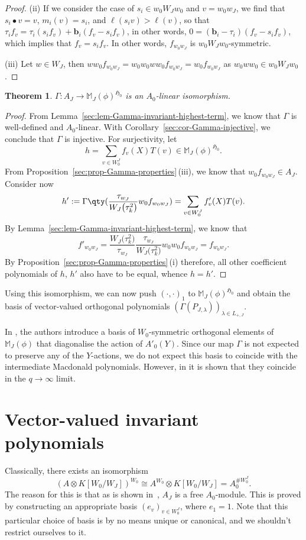 \documentclass[10pt,a4paper]{amsart}
\newtheorem{Theorem}{Theorem}[section]
\theoremstyle{definition}
\numberwithin{equation}{section}
\begin{document}
\begin{proof}
(ii) If we consider the case of $s_i\in w_0W_Jw_0$ and $v=w_0w_J$, we find
 that $s_i\bullet v=v$, $m_i(v)=s_i$, and $\ell(s_iv)>\ell(v)$, so that
$
 \tau_i f_v = \tau_i (s_if_v) + \bm{b}_i(f_v-s_if_v)$,
 in other words,
$
 0 = (\bm{b}_i-\tau_i)(f_v-s_if_v)$,
 which implies that $f_v=s_if_v$. In other words, $f_{w_0w_J}$ is
 $w_0W_Jw_0$-symmetric.

(iii) Let $w\in W_J$, then
$
 w w_0 f_{w_0w_J} = w_0 w_0 w w_0 f_{w_0w_J}
 = w_0 f_{w_0w_J}
$
 as $w_0ww_0\in w_0W_Jw_0$.
\end{proof}

\begin{Theorem}
 $\Gamma\colon A_J\to \mathbb{M}_J(\phi)^{\mathfrak{H}_0}$ is an
 $A_0$-linear isomorphism.
\end{Theorem}
\begin{proof}
 From Lemma~\ref{sec:lem-Gamma-invariant-highest-term}, we know that
 $\Gamma$ is well-defined and $A_0$-linear. With Corollary~\ref{sec:cor-Gamma-injective}, we conclude that $\Gamma$ is injective. For surjectivity,
 let
 \[
 h = \sum_{v\in W_0^J} f_v(X)T(v)\in\mathbb{M}_J(\phi)^{\mathfrak{H}_0}.
 \]
 From Proposition~\ref{sec:prop-Gamma-properties}\,(iii), we know that
 $w_0f_{w_0w_J}\in A_J$. Consider now
 \[
 h' := \Gamma\qty(\frac{\tau_{w_J}}{W_J\bigl(\tau_k^2\bigr)} w_0f_{w_0w_J})
 = \sum_{v\in W_0^J} f'_v(X)T(v).
 \]
 By Lemma~\ref{sec:lem-Gamma-invariant-highest-term}, we know that
 \[
 f'_{w_0w_J} = \frac{W_J\bigl(\tau_k^2\bigr)}{\tau_{w_J}}
 \frac{\tau_{w_J}}{W_J\bigl(\tau_k^2\bigr)} w_0 w_0 f_{w_0w_J}
 = f_{w_0w_J}.
 \]
 By Proposition~\ref{sec:prop-Gamma-properties}\,(i) therefore,
 all other coefficient polynomials of $h$, $h'$ also have to be equal,
 whence $h=h'$.
\end{proof}

Using this isomorphism, we can now push $(\cdot,\cdot)_1$ to
$\mathbb{M}_J(\phi)^{\mathfrak{H}_0}$ and obtain the basis of vector-valued
orthogonal polynomials $(\Gamma(P_{J,\lambda}))_{\lambda\in L_{+,J}}$.

In \cite[Section~6.6]{stokmanInduced}, the authors introduce a basis
of $W_0$-symmetric orthogonal elements of~$\mathbb{M}_J(\phi)$ that
diagonalise the action of $A'_0(Y)$. Since our map $\Gamma$ is not
expected to preserve
any of the $Y$-actions, we do not expect this basis to coincide with the intermediate Macdonald polynomials.
However, in \cite[Theorem~7.6]{Ven25} it is shown that they coincide in the
$q\to\infty$ limit.

\section{Vector-valued invariant polynomials}\label{sec:w0-invariant}
Classically, there exists an isomorphism
\[
 (A\otimes K[W_0/W_J])^{W_0}
 \cong A^{W_0} \otimes K[W_0/W_J]
 = A_0^{\# W_0^J}.
\]
The reason for this is that as is shown in~\cite{pittieSteinberg},
$A_J$ is a free $A_0$-module. This is proved by constructing an appropriate
basis $(e_v)_{v\in W_0^J}$, where $e_1=1$. Note that this
particular choice of basis is by no means unique or canonical, and we shouldn't
restrict ourselves to it.
\end{document}
